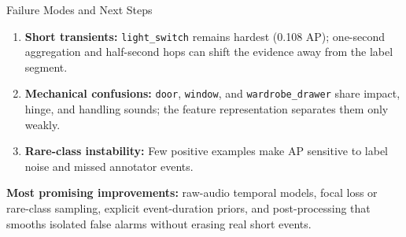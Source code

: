 \documentclass[aspectratio=169,english]{beamer}
\begin{document}
\begin{frame}{Failure Modes and Next Steps}
  \begin{enumerate}
    \item \textbf{Short transients:}
    \texttt{light\_switch} remains hardest (0.108 AP); one-second aggregation and half-second hops can shift the evidence away from the label segment.

    \vspace{0.35em}
    \item \textbf{Mechanical confusions:}
    \texttt{door}, \texttt{window}, and \texttt{wardrobe\_drawer} share impact, hinge, and handling sounds; the feature representation separates them only weakly.

    \vspace{0.35em}
    \item \textbf{Rare-class instability:}
    Few positive examples make AP sensitive to label noise and missed annotator events.
  \end{enumerate}
  \vspace{0.6em}
  \textbf{Most promising improvements:}
  raw-audio temporal models, focal loss or rare-class sampling, explicit event-duration priors, and post-processing that smooths isolated false alarms without erasing real short events.
\end{frame}
\end{document}
